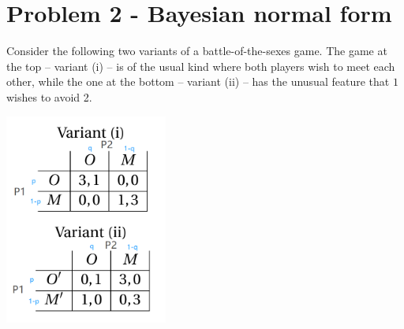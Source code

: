 \documentclass{article}
\begin{document}
\section{Problem 2 - Bayesian normal form}

Consider the following two variants of a battle-of-the-sexes game. The game at the top --
variant (i) -- is of the usual kind where both players wish to meet each other, while the one
at the bottom -- variant (ii) -- has the unusual feature that $1$ wishes to avoid 2.\vspace{-6pt}




\begin{center}
\includegraphics[width=0.4\textwidth]{9.q2}
\vspace{2mm}
\end{center}
\end{document}
